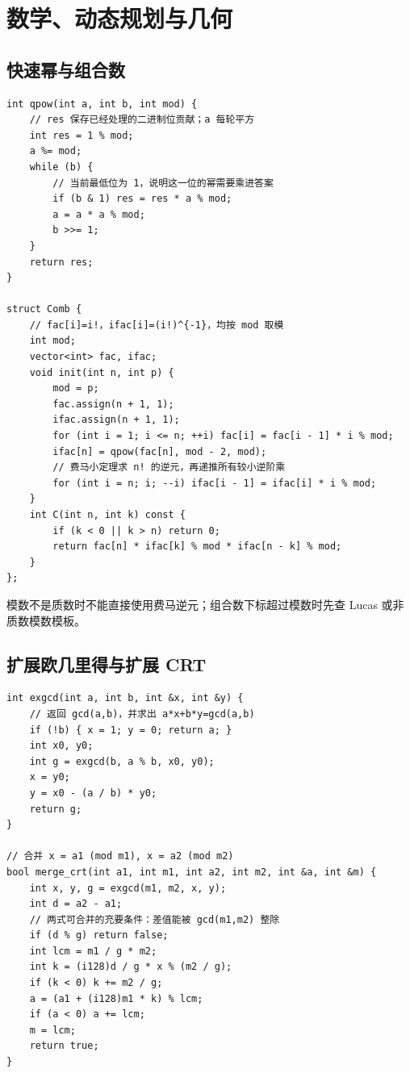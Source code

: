\chapter{数学、动态规划与几何}

\section{快速幂与组合数}


\begin{lstlisting}[style=cpp]
int qpow(int a, int b, int mod) {
    // res 保存已经处理的二进制位贡献；a 每轮平方
    int res = 1 % mod;
    a %= mod;
    while (b) {
        // 当前最低位为 1，说明这一位的幂需要乘进答案
        if (b & 1) res = res * a % mod;
        a = a * a % mod;
        b >>= 1;
    }
    return res;
}

struct Comb {
    // fac[i]=i!，ifac[i]=(i!)^{-1}，均按 mod 取模
    int mod;
    vector<int> fac, ifac;
    void init(int n, int p) {
        mod = p;
        fac.assign(n + 1, 1);
        ifac.assign(n + 1, 1);
        for (int i = 1; i <= n; ++i) fac[i] = fac[i - 1] * i % mod;
        ifac[n] = qpow(fac[n], mod - 2, mod);
        // 费马小定理求 n! 的逆元，再递推所有较小逆阶乘
        for (int i = n; i; --i) ifac[i - 1] = ifac[i] * i % mod;
    }
    int C(int n, int k) const {
        if (k < 0 || k > n) return 0;
        return fac[n] * ifac[k] % mod * ifac[n - k] % mod;
    }
};
\end{lstlisting}

\begin{warnbox}
模数不是质数时不能直接使用费马逆元；组合数下标超过模数时先查 Lucas 或非质数模数模板。
\end{warnbox}

\section{扩展欧几里得与扩展 CRT}


\begin{lstlisting}[style=cpp]
int exgcd(int a, int b, int &x, int &y) {
    // 返回 gcd(a,b)，并求出 a*x+b*y=gcd(a,b)
    if (!b) { x = 1; y = 0; return a; }
    int x0, y0;
    int g = exgcd(b, a % b, x0, y0);
    x = y0;
    y = x0 - (a / b) * y0;
    return g;
}

// 合并 x = a1 (mod m1), x = a2 (mod m2)
bool merge_crt(int a1, int m1, int a2, int m2, int &a, int &m) {
    int x, y, g = exgcd(m1, m2, x, y);
    int d = a2 - a1;
    // 两式可合并的充要条件：差值能被 gcd(m1,m2) 整除
    if (d % g) return false;
    int lcm = m1 / g * m2;
    int k = (i128)d / g * x % (m2 / g);
    if (k < 0) k += m2 / g;
    a = (a1 + (i128)m1 * k) % lcm;
    if (a < 0) a += lcm;
    m = lcm;
    return true;
}
\end{lstlisting}

